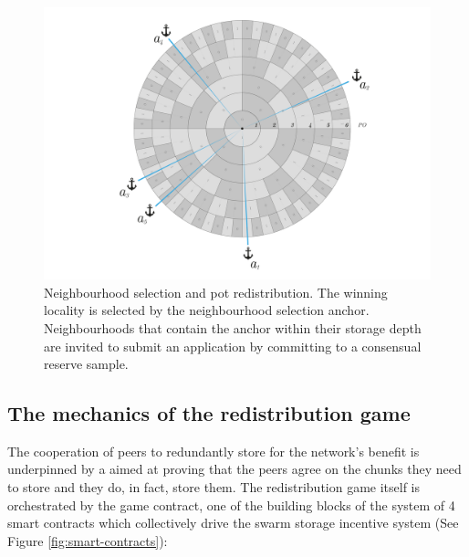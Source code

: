 \begin{figure}[!ht]
  \centering
    \includegraphics[width=\textwidth]{fig/nhd-selection.pdf}
  \caption[Neighbourhood selection and pot redistribution]{Neighbourhood selection and pot redistribution. The winning locality is selected by the neighbourhood selection anchor. Neighbourhoods that contain the anchor within their storage depth are invited to submit an application by committing to a consensual reserve sample. }
\label{fig:neighbourhood-selection}
\end{figure}    

    


\subsection{The mechanics of the redistribution game}\label{sec:mechanics}

The cooperation of peers to redundantly store for the network's benefit is underpinned by a 
aimed at proving that the peers agree on the chunks they need to store and they do, in fact, store them. The redistribution game itself is orchestrated by the game contract, one of the building blocks of the system of 4 smart contracts which collectively drive the swarm storage incentive system (See Figure \ref{fig:smart-contracts}):

